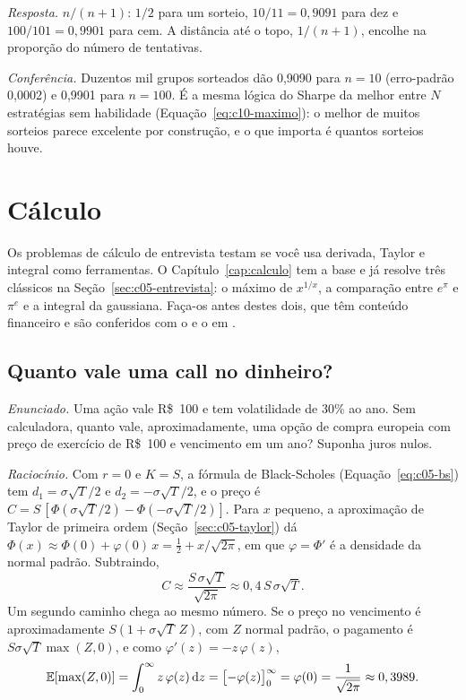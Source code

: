 \emph{Resposta.} $n/(n+1)$: $1/2$ para um sorteio, $10/11 = 0,9091$ para dez e $100/101 = 0,9901$ para cem. A distância até o topo, $1/(n+1)$, encolhe na proporção do número de tentativas.

\emph{Conferência.} Duzentos mil grupos sorteados dão 0,9090 para $n = 10$ (erro-padrão 0,0002) e 0,9901 para $n = 100$. É a mesma lógica do Sharpe da melhor entre $N$ estratégias sem habilidade (Equação~\eqref{eq:c10-maximo}): o melhor de muitos sorteios parece excelente por construção, e o que importa é quantos sorteios houve.

\section{Cálculo}
\label{sec:c16-calculo}

Os problemas de cálculo de entrevista testam se você usa derivada, Taylor e integral como ferramentas. O Capítulo~\ref{cap:calculo} tem a base e já resolve três clássicos na Seção~\ref{sec:c05-entrevista}: o máximo de $x^{1/x}$, a comparação entre $e^{\pi}$ e $\pi^{e}$ e a integral da gaussiana. Faça-os antes destes dois, que têm conteúdo financeiro e são conferidos com o  e o  em .

\subsection{Quanto vale uma call no dinheiro?}

\emph{Enunciado.} Uma ação vale R\$~100 e tem volatilidade de 30\% ao ano. Sem calculadora, quanto vale, aproximadamente, uma opção de compra europeia com preço de exercício de R\$~100 e vencimento em um ano? Suponha juros nulos.

\emph{Raciocínio.} Com $r = 0$ e $K = S$, a fórmula de Black-Scholes (Equação~\eqref{eq:c05-bs}) tem $d_1 = \sigma\sqrt{T}/2$ e $d_2 = -\sigma\sqrt{T}/2$, e o preço é $C = S\,[\Phi(\sigma\sqrt{T}/2) - \Phi(-\sigma\sqrt{T}/2)]$. Para $x$ pequeno, a aproximação de Taylor de primeira ordem (Seção~\ref{sec:c05-taylor}) dá $\Phi(x) \approx \Phi(0) + \varphi(0)\,x = \frac12 + x/\sqrt{2\pi}$, em que $\varphi = \Phi'$ é a densidade da normal padrão. Subtraindo,
\begin{equation*}
  C \approx \frac{S\,\sigma\sqrt{T}}{\sqrt{2\pi}} \approx 0,4\, S\,\sigma\sqrt{T} .
\end{equation*}
Um segundo caminho chega ao mesmo número. Se o preço no vencimento é aproximadamente $S(1 + \sigma\sqrt{T}\,Z)$, com $Z$ normal padrão, o pagamento é $S\sigma\sqrt{T}\max(Z, 0)$, e como $\varphi'(z) = -z\,\varphi(z)$,
\begin{equation*}
  \operatorname{\mathbb{E}}[\max(Z, 0)] = \int_0^{\infty} z\,\varphi(z)\mathop{}\!\mathrm{d} z = \bigl[-\varphi(z)\bigr]_0^{\infty} = \varphi(0) = \frac{1}{\sqrt{2\pi}} \approx 0,3989 .
\end{equation*}

